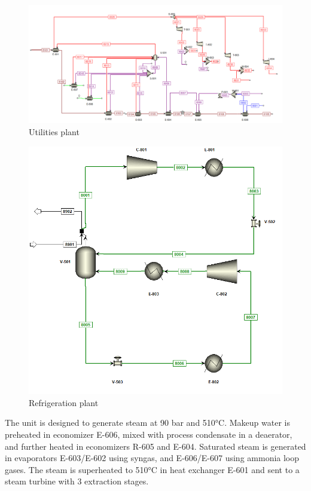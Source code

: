 \documentclass[a4paper, titlepage]{article}
\begin{document}
\begin{figure}[htb]
    \includegraphics[width=\textwidth]{img/aspen_utilities.png}
    \caption{Utilities plant}
    \label{img_aspenutilities}
\end{figure}
\begin{figure}[htb]
    \includegraphics[width=\textwidth]{img/aspen_chiller.png}
    \caption{Refrigeration plant}
    \label{img_aspenrefrigeration}
\end{figure}


The unit is designed to generate steam at 90 bar and 510°C. Makeup water is preheated in economizer E-606, mixed with
process condensate in a deaerator, and further heated in economizers R-605 and E-604. Saturated steam is generated in
evaporators E-603/E-602 using syngas, and E-606/E-607 using ammonia loop gases. The steam is superheated to 510°C
in heat exchanger E-601 and sent to a steam turbine with 3 extraction stages.
\end{document}
